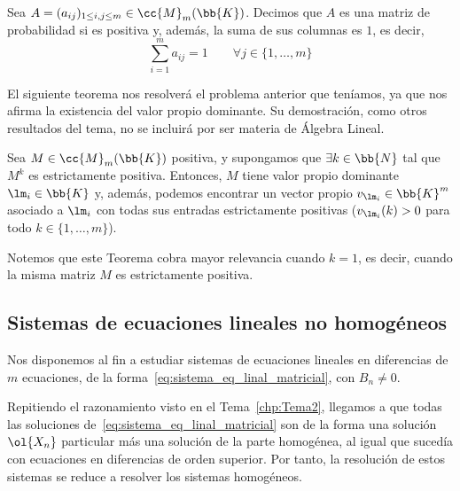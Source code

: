 \begin{definicion}
    Sea $A=(a_{ij})_{1\leq i,j\leq m}\in \cc{M}_m(\bb{K})$. Decimos que
    $A$ es una matriz de probabilidad si es positiva y, además, la suma de sus columnas es $1$, es decir,
    \begin{equation*}
        \sum_{i=1}^m a_{ij} = 1\qquad \forall j\in \{1,\dots, m\}
    \end{equation*}
\end{definicion}

El siguiente teorema nos resolverá el problema anterior que teníamos, ya que nos afirma la existencia del valor propio dominante. Su demostración, como otros resultados del tema, no se incluirá por ser materia de Álgebra Lineal.
\begin{teo}
    Sea $M\in \cc{M}_m(\bb{K})$ positiva, y supongamos que $\exists k\in \bb{N}$ tal que $M^k$ es estrictamente positiva. Entonces, $M$ tiene valor propio dominante $\lm_i\in \bb{K}$ y, además, podemos encontrar un vector propio $v_{\lm_i}\in \bb{K}^m$ asociado a $\lm_i$ con todas sus entradas estrictamente positivas ($v_{\lm_i}(k)>0$ para todo $k\in \{1,\dots,m\}$).
\end{teo}
Notemos que este Teorema cobra mayor relevancia cuando $k=1$, es decir, cuando la misma matriz $M$ es estrictamente positiva.























\subsection{Sistemas de ecuaciones lineales no homogéneos}
Nos disponemos al fin a estudiar sistemas de ecuaciones lineales en diferencias de $m$ ecuaciones, de la forma~\ref{eq:sistema_eq_linal_matricial}, con $B_n\neq 0$.

Repitiendo el razonamiento visto en el Tema~\ref{chp:Tema2}, llegamos a que todas las soluciones de~\ref{eq:sistema_eq_linal_matricial} son de la forma una solución $\ol{X_n}$ particular más una solución de la parte homogénea, al igual que sucedía con ecuaciones en diferencias de orden superior. Por tanto, la resolución de estos sistemas se reduce a resolver los sistemas homogéneos.


